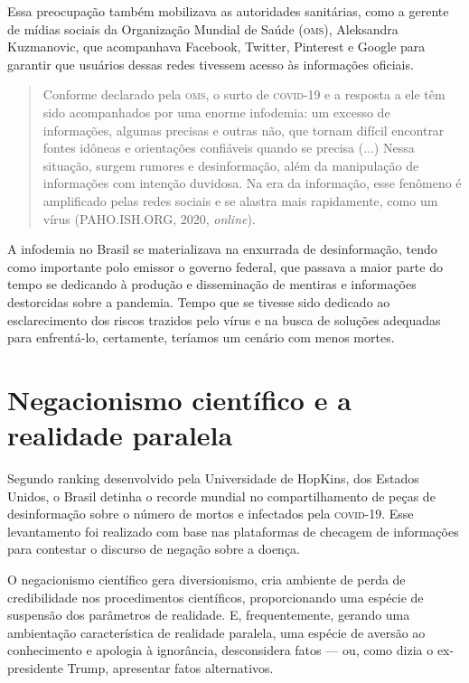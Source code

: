 Essa preocupação também mobilizava as autoridades sanitárias, como a
gerente de mídias sociais da Organização Mundial de Saúde (\textsc{oms}),
Aleksandra Kuzmanovic, que acompanhava Facebook, Twitter, Pinterest e
Google para garantir que usuários dessas redes tivessem acesso às
informações oficiais.

\begin{quote}
Conforme declarado pela \textsc{oms}, o surto de \textsc{covid-19} e a resposta a ele têm
sido acompanhados por uma enorme infodemia: um excesso de informações,
algumas precisas e outras não, que tornam difícil encontrar fontes
idôneas e orientações confiáveis quando se precisa (...) Nessa situação,
surgem rumores e desinformação, além da manipulação de informações com
intenção duvidosa. Na era da informação, esse fenômeno é amplificado
pelas redes sociais e se alastra mais rapidamente, como um vírus
(PAHO.ISH.ORG, 2020, \textit{online}).
\end{quote}

A infodemia no Brasil se materializava na enxurrada de desinformação,
tendo como importante polo emissor o governo federal, que passava a maior 
parte do tempo se dedicando à produção e disseminação de mentiras e informações
destorcidas sobre a pandemia. Tempo que se tivesse sido dedicado ao
esclarecimento dos riscos trazidos pelo vírus e na busca de soluções
adequadas para enfrentá-lo, certamente, teríamos um cenário com menos
mortes.

\section{Negacionismo científico e a realidade paralela}

Segundo ranking desenvolvido pela Universidade de HopKins, dos Estados
Unidos, o Brasil detinha o recorde mundial no compartilhamento de peças
de desinformação sobre o número de mortos e infectados pela \textsc{covid-19}.
Esse levantamento foi realizado com base nas plataformas de checagem de
informações para contestar o discurso de negação sobre a doença.

O negacionismo científico gera diversionismo, cria ambiente de perda de
credibilidade nos procedimentos científicos, proporcionando uma espécie
de suspensão dos parâmetros de realidade. E, frequentemente, gerando uma
ambientação característica de realidade paralela, uma espécie de aversão
ao conhecimento e apologia à ignorância, desconsidera fatos --- ou, como
dizia o ex-presidente Trump, apresentar fatos alternativos.

